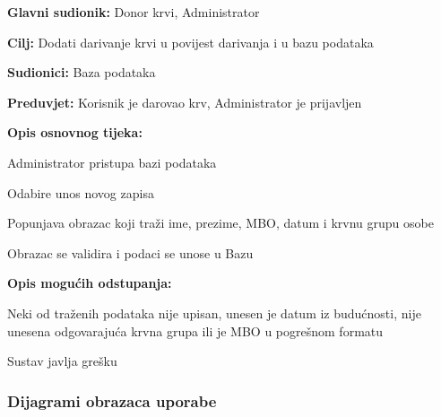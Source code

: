 					
					\noindent {}
					\begin{packed_item}
						
						\item \textbf{Glavni sudionik: }Donor krvi, Administrator
						\item  \textbf{Cilj:} Dodati darivanje krvi u povijest darivanja i u bazu podataka
						\item  \textbf{Sudionici:} Baza podataka
						\item  \textbf{Preduvjet:} Korisnik je darovao krv, Administrator je prijavljen
						\item  \textbf{Opis osnovnog tijeka:}
						
						\item[] \begin{packed_enum}
							
							\item Administrator pristupa bazi podataka
							\item Odabire unos novog zapisa
							\item Popunjava obrazac koji traži ime, prezime, MBO, datum i krvnu grupu osobe
							\item Obrazac se validira i podaci se unose u Bazu
						\end{packed_enum}
						
						\item  \textbf{Opis mogućih odstupanja:}
						
						\item[] \begin{packed_item}
							
							\item[4.a] Neki od traženih podataka nije upisan, unesen je datum iz budućnosti, nije unesena odgovarajuća krvna grupa ili je MBO u pogrešnom formatu
							\item[] \begin{packed_enum}
								
								\item Sustav javlja grešku
								
						\end{packed_enum}				
							
						\end{packed_item}
					\end{packed_item}
					
					
					
				\subsubsection{Dijagrami obrazaca uporabe}
					
